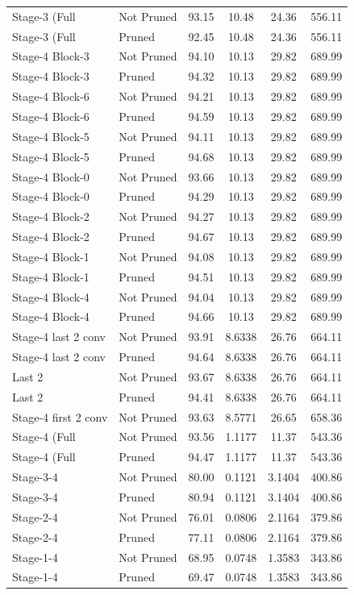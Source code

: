 \begin{table}
\begin{tabular}{llcccc}
Stage-3 (Full & Not Pruned & 93.15 & 10.48 & 24.36 & 556.11 \\
Stage-3 (Full & Pruned & 92.45 & 10.48 & 24.36 & 556.11 \\
Stage-4 Block-3 & Not Pruned & 94.10 & 10.13 & 29.82 & 689.99 \\
Stage-4 Block-3 & Pruned & 94.32 & 10.13 & 29.82 & 689.99 \\
Stage-4 Block-6 & Not Pruned & 94.21 & 10.13 & 29.82 & 689.99 \\
Stage-4 Block-6 & Pruned & 94.59 & 10.13 & 29.82 & 689.99 \\
Stage-4 Block-5 & Not Pruned & 94.11 & 10.13 & 29.82 & 689.99 \\
Stage-4 Block-5 & Pruned & 94.68 & 10.13 & 29.82 & 689.99 \\
Stage-4 Block-0 & Not Pruned & 93.66 & 10.13 & 29.82 & 689.99 \\
Stage-4 Block-0 & Pruned & 94.29 & 10.13 & 29.82 & 689.99 \\
Stage-4 Block-2 & Not Pruned & 94.27 & 10.13 & 29.82 & 689.99 \\
Stage-4 Block-2 & Pruned & 94.67 & 10.13 & 29.82 & 689.99 \\
Stage-4 Block-1 & Not Pruned & 94.08 & 10.13 & 29.82 & 689.99 \\
Stage-4 Block-1 & Pruned & 94.51 & 10.13 & 29.82 & 689.99 \\
Stage-4 Block-4 & Not Pruned & 94.04 & 10.13 & 29.82 & 689.99 \\
Stage-4 Block-4 & Pruned & 94.66 & 10.13 & 29.82 & 689.99 \\
Stage-4 last 2 conv & Not Pruned & 93.91 & 8.6338 & 26.76 & 664.11 \\
Stage-4 last 2 conv & Pruned & 94.64 & 8.6338 & 26.76 & 664.11 \\
Last 2 & Not Pruned & 93.67 & 8.6338 & 26.76 & 664.11 \\
Last 2 & Pruned & 94.41 & 8.6338 & 26.76 & 664.11 \\
Stage-4 first 2 conv & Not Pruned & 93.63 & 8.5771 & 26.65 & 658.36 \\
Stage-4 (Full & Not Pruned & 93.56 & 1.1177 & 11.37 & 543.36 \\
Stage-4 (Full & Pruned & 94.47 & 1.1177 & 11.37 & 543.36 \\
Stage-3-4 & Not Pruned & 80.00 & 0.1121 & 3.1404 & 400.86 \\
Stage-3-4 & Pruned & 80.94 & 0.1121 & 3.1404 & 400.86 \\
Stage-2-4 & Not Pruned & 76.01 & 0.0806 & 2.1164 & 379.86 \\
Stage-2-4 & Pruned & 77.11 & 0.0806 & 2.1164 & 379.86 \\
Stage-1-4 & Not Pruned & 68.95 & 0.0748 & 1.3583 & 343.86 \\
Stage-1-4 & Pruned & 69.47 & 0.0748 & 1.3583 & 343.86 \\
\bottomrule
\end{tabular}
\end{table}
